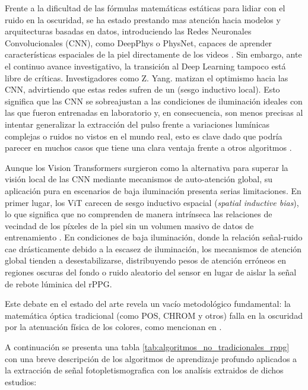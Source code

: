 Frente a la dificultad de las fórmulas matemáticas estáticas para lidiar con el ruido en la oscuridad, se ha estado prestando mas atención hacia modelos y
arquitecturas basadas en datos, introduciendo las Redes Neuronales Convolucionales (CNN), como DeepPhys o PhysNet, capaces de aprender características espaciales 
de la piel directamente de los videos \cite{chen2024image_en, yang2022assessment_dl, nguyen2024artifact_resilience, xi2022weighted, effective2023cross,  dehnad2024factorize, zhuang2022fastbvp, speth2023hallucinated, xue2025noncontact, ma2025rfbayes, cen2025robust, liu2025synrppg}. 
Sin embargo, ante el continuo avance investigativo, la transición al Deep Learning tampoco está libre de críticas. Investigadores como Z. Yang. matizan el 
optimismo hacia las CNN, advirtiendo que estas redes sufren de un (sesgo inductivo local). Esto significa que las CNN se sobreajustan a las condiciones de 
iluminación ideales con las que fueron entrenadas en laboratorio y, en consecuencia, son menos precisas al intentar generalizar la extracción del pulso frente 
a variaciones lumínicas complejas o ruidos no vistos en el mundo real, esto es clave dado que podría parecer en muchos casos que tiene una clara ventaja frente a otros algoritmos \cite{yang2022assessment_dl}.

Aunque los Vision Transformers surgieron como la alternativa para superar la visión local de las CNN mediante mecanismos de auto-atención global, su 
aplicación pura en escenarios de baja iluminación presenta serias limitaciones. En primer lugar, los ViT carecen de sesgo inductivo espacial 
(\textit{spatial inductive bias}), lo que significa que no comprenden de manera intrínseca las relaciones de vecindad de los píxeles de la piel sin un 
volumen masivo de datos de entrenamiento \cite{transphys2023}. En condiciones de baja iluminación, donde la relación señal-ruido cae drásticamente 
debido a la escasez de iluminación, los mecanismos de atención global tienden a desestabilizarse, distribuyendo pesos de atención erróneos en regiones 
oscuras del fondo o ruido aleatorio del sensor en lugar de aislar la señal de rebote lúminica del rPPG.

Este debate en el estado del arte revela un vacío metodológico fundamental: la matemática óptica tradicional (como POS, CHROM y otros) falla en la oscuridad por la 
atenuación física de los colores, como mencionan en \cite{yang2022assessment_dl, yang2022image_en, xi2022weighted}.


A continuación se presenta una tabla \ref{tab:algoritmos_no_tradicionales_rppg} con una breve descripción de los algoritmos de aprendizaje profundo aplicados
a la extracción de señal fotopletismografica con los analísis extraidos de dichos estudios:

